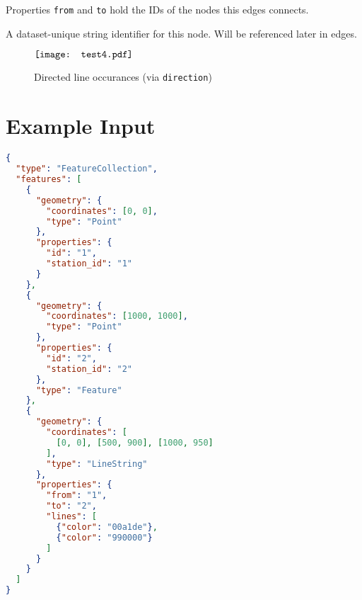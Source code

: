 \documentclass[10pt,a4paper]{article}
\begin{document}
Properties \texttt{from} and \texttt{to} hold the IDs of the nodes this edges connects. 

\begin{description}[align=right]
  \item[\texttt{id}] A dataset-unique string identifier for this node. Will be referenced later in edges.

\end{description}

\begin{figure}
  \centering
$	\vcenter{\hbox{\texttt{[image: test4.pdf]}}}$
	\caption{Directed line occurances (via \texttt{direction})}
\end{figure}

\section{Example Input}


\begin{lstlisting}[language=json,firstnumber=1]
{
  "type": "FeatureCollection",
  "features": [
    {
      "geometry": {
        "coordinates": [0, 0],
        "type": "Point"
      },
      "properties": {
        "id": "1",
        "station_id": "1"
      }
    },
    {
      "geometry": {
        "coordinates": [1000, 1000],
        "type": "Point"
      },
      "properties": {
        "id": "2",
        "station_id": "2"
      },
      "type": "Feature"
    },
    {
      "geometry": {
        "coordinates": [
          [0, 0], [500, 900], [1000, 950]
        ],
        "type": "LineString"
      },
      "properties": {
        "from": "1",
        "to": "2",
        "lines": [
          {"color": "00a1de"},
          {"color": "990000"}
        ]
      }
    }
  ]
}
\end{lstlisting}
\end{document}

